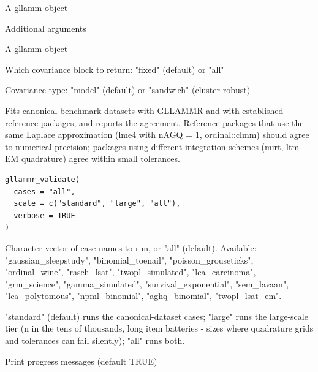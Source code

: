 \documentclass[a4paper]{book}
\begin{document}
%
\begin{Arguments}
\begin{ldescription}
\item[\code{x}] A gllamm object

\item[\code{...}] Additional arguments

\item[\code{object}] A gllamm object

\item[\code{which}] Which covariance block to return: "fixed" (default) or "all"

\item[\code{type}] Covariance type: "model" (default) or "sandwich"
(cluster-robust)
\end{ldescription}
\end{Arguments}
%
\begin{Description}
Fits canonical benchmark datasets with GLLAMMR and with established
reference packages, and reports the agreement. Reference packages that use
the same Laplace approximation (lme4 with nAGQ = 1, ordinal::clmm) should
agree to numerical precision; packages using different integration schemes
(mirt, ltm EM quadrature) agree within small tolerances.
\end{Description}
%
\begin{Usage}
\begin{verbatim}
gllammr_validate(
  cases = "all",
  scale = c("standard", "large", "all"),
  verbose = TRUE
)
\end{verbatim}
\end{Usage}
%
\begin{Arguments}
\begin{ldescription}
\item[\code{cases}] Character vector of case names to run, or "all" (default).
Available: "gaussian\_sleepstudy", "binomial\_toenail",
"poisson\_grouseticks", "ordinal\_wine", "rasch\_lsat", "twopl\_simulated",
"lca\_carcinoma", "grm\_science", "gamma\_simulated",
"survival\_exponential", "sem\_lavaan", "lca\_polytomous",
"npml\_binomial", "aghq\_binomial", "twopl\_lsat\_em".

\item[\code{scale}] "standard" (default) runs the canonical-dataset cases;
"large" runs the large-scale tier (n in the tens of thousands, long
item batteries - sizes where quadrature grids and tolerances can fail
silently); "all" runs both.

\item[\code{verbose}] Print progress messages (default TRUE)
\end{ldescription}
\end{Arguments}
\end{document}
